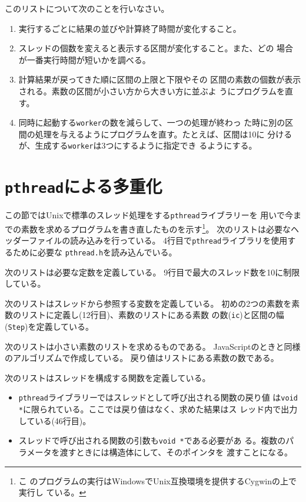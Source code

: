  \begin{Prob}\upshape このリストについて次のことを行いなさい。
  \begin{enumerate}
   \item 実行するごとに結果の並びや計算終了時間が変化すること。
   \item スレッドの個数を変えると表示する区間が変化すること。また、どの
         場合が一番実行時間が短いかを調べる。
   \item 計算結果が戻ってきた順に区間の上限と下限やその
 区間の素数の個数が表示される。素数の区間が小さい方から大きい方に並ぶよ
 うにプログラムを直す。
   \item 同時に起動する\texttt{worker}の数を減らして、一つの処理が終わっ
         た時に別の区間の処理を与えるようにプログラムを直す。たとえば、区間は10に
         分けるが、生成する\texttt{worker}は3つにするように指定でき
         るようにする。
  \end{enumerate} 
 \end{Prob}
 \iffalse
 \section{\texttt{pthread}による多重化}
 この節ではUnixで標準のスレッド処理をする\texttt{pthread}ライブラリーを
  用いで今までの素数を求めるプログラムを書き直したものを示す\footnote{こ
  のプログラムの実行はWindowsでUnix互換環境を提供するCygwinの上で実行し
  ている。}。
	次のリストは必要なヘッダーファイルの読み込みを行っている。
	4行目で\texttt{pthread}ライブラリを使用するために必要な
  \texttt{pthread.h}を読み込んでいる。

	次のリストは必要な定数を定義している。
	9行目で最大のスレッド数を10に制限している。

	次のリストはスレッドから参照する変数を定義している。
	初めの2つの素数を素数のリストに定義し(12行目)、素数のリストにある素数
  の数(\texttt{ic})と区間の幅(\texttt{Step})を定義している。

	次のリストは小さい素数のリストを求めるものである。
	JavaScriptのときと同様のアルゴリズムで作成している。
  戻り値はリストにある素数の数である。

	次のリストはスレッドを構成する関数を定義している。
	\begin{itemize}
	 \item 	\texttt{pthread}ライブラリーではスレッドとして呼び出される関数の戻り値
  は\texttt{void *}に限られている。ここでは戻り値はなく、求めた結果はス
  レッド内で出力している(46行目)。
	 \item スレッドで呼び出される関数の引数も\texttt{void *}である必要があ
				 る。複数のパラメータを渡すときには構造体にして、そのポインタを
				 渡すことになる。
	\end{itemize}


